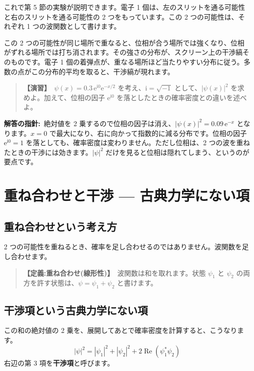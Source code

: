 \documentclass{article}
\begin{document}
これで第 5 節の実験が説明できます。電子 1 個は、左のスリットを通る可能性と右のスリットを通る可能性の 2 つをもっています。この 2 つの可能性は、それぞれ 1 つの波関数として書けます。

この 2 つの可能性が同じ場所で重なると、位相が合う場所では強くなり、位相がずれる場所では打ち消されます。その強さの分布が、スクリーン上の干渉縞そのものです。電子 1 個の着弾点が、重なる場所ほど当たりやすい分布に従う。多数の点がこの分布的平均を取ると、干渉縞が現れます。

\begin{quote}
\textbf{【演習】}\ \(\psi(x) = 0.3\,\mathrm{e}^{\mathrm{i}0}\mathrm{e}^{-x/2}\) を考え、\(\mathrm{i} = \sqrt{-1}\) として、\(|\psi(x)|^2\) を求めよ。加えて、位相の因子 \(\mathrm{e}^{\mathrm{i}0}\) を落としたときの確率密度との違いを述べよ。
\end{quote}

\textbf{解答の指針:}\ 絶対値を 2 乗するので位相の因子は消え、\(|\psi(x)|^2 = 0.09\,\mathrm{e}^{-x}\) となります。\(x = 0\) で最大になり、右に向かって指数的に減る分布です。位相の因子 \(\mathrm{e}^{\mathrm{i}0} = 1\) を落としても、確率密度は変わりません。ただし位相は、2 つの波を重ねたときの干渉には効きます。\(|\psi|^2\) だけを見ると位相は隠れてしまう、というのが要点です。

\section{重ね合わせと干渉 — 古典力学にない項}

\subsection{重ね合わせという考え方}

2 つの可能性を重ねるとき、確率を足し合わせるのではありません。波関数を足し合わせます。

\begin{quote}
\textbf{【定義:重ね合わせ(線形性)】}\ 波関数は和を取れます。状態 \(\psi_1\) と \(\psi_2\) の両方を許す状態は、\(\psi = \psi_1 + \psi_2\) と書けます。
\end{quote}

\subsection{干渉項という古典力学にない項}

この和の絶対値の 2 乗を、展開してあとで確率密度を計算すると、こうなります。
\[ |\psi|^2 = |\psi_1|^2 + |\psi_2|^2 + 2\operatorname{Re}\left(\psi_1^{*}\psi_2\right) \]
右辺の第 3 項を\textbf{干渉項}と呼びます。
\end{document}
